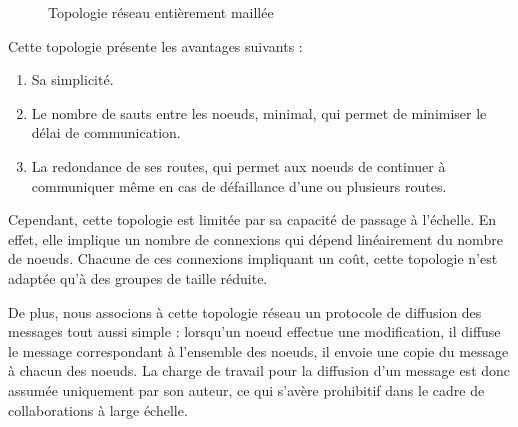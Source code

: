 \begin{figure}[!ht]
{
    }
    \caption{Topologie réseau entièrement maillée}
    \label{fig:full-meshed-topology}
  \end{figure}

Cette topologie présente les avantages suivants :
\begin{enumerate}
    \item Sa simplicité.
    \item Le nombre de sauts entre les noeuds, minimal, qui permet de minimiser le délai de communication.
    \item La redondance de ses routes, qui permet aux noeuds de continuer à communiquer même en cas de défaillance d'une ou plusieurs routes.
\end{enumerate}

Cependant, cette topologie est limitée par sa capacité de passage à l'échelle.
En effet, elle implique un nombre de connexions qui dépend linéairement du nombre de noeuds.
Chacune de ces connexions impliquant un coût, cette topologie n'est adaptée qu'à des groupes de taille réduite.

De plus, nous associons à cette topologie réseau un protocole de diffusion des messages tout aussi simple : lorsqu'un noeud effectue une modification, il diffuse le message correspondant à l'ensemble des noeuds, \ie il envoie une copie du message à chacun des noeuds.
La charge de travail pour la diffusion d'un message est donc assumée uniquement par son auteur, ce qui s'avère prohibitif dans le cadre de collaborations à large échelle. \\

